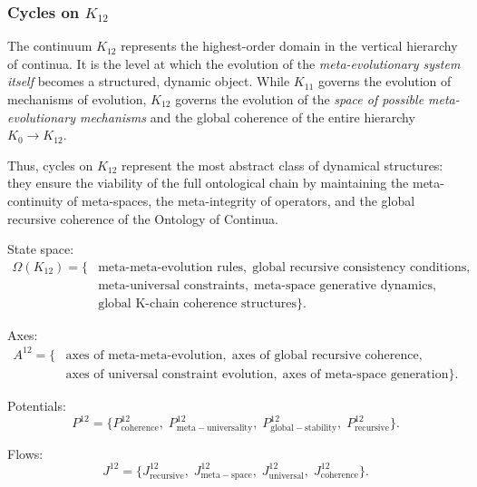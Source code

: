 
\subsubsection{Cycles on $K_{12}$}
\label{sec:cycles-k12}

The continuum $K_{12}$ represents the highest-order domain in the vertical
hierarchy of continua. It is the level at which the evolution of the
\emph{meta-evolutionary system itself} becomes a structured, dynamic object.
While $K_{11}$ governs the evolution of mechanisms of evolution, $K_{12}$
governs the evolution of the \emph{space of possible meta-evolutionary
mechanisms} and the global coherence of the entire hierarchy
$K_0 \to K_{12}$.

Thus, cycles on $K_{12}$ represent the most abstract class of dynamical
structures: they ensure the viability of the full ontological chain by
maintaining the meta-continuity of meta-spaces, the meta-integrity of
operators, and the global recursive coherence of the Ontology of Continua.

State space:
\[
  \begin{aligned}
  \Omega(K_{12})
  = \{&
     \text{meta-meta-evolution rules},\;
     \text{global recursive consistency conditions},\\
     &\text{meta-universal constraints},\;
     \text{meta-space generative dynamics},\\
     &\text{global K-chain coherence structures}
  \}.
  \end{aligned}
\]

Axes:
\[
  \begin{aligned}
  A^{12}
  = \{&
     \text{axes of meta-meta-evolution},\;
     \text{axes of global recursive coherence},\\
     &\text{axes of universal constraint evolution},\;
     \text{axes of meta-space generation}
  \}.
  \end{aligned}
\]

Potentials:
\[
  P^{12}
  =
  \{
     P^{12}_{\mathrm{coherence}},\;
     P^{12}_{\mathrm{meta\!-\!universality}},\;
     P^{12}_{\mathrm{global\!-\!stability}},\;
     P^{12}_{\mathrm{recursive}}
  \}.
\]

Flows:
\[
  J^{12}
  =
  \{
    J^{12}_{\mathrm{recursive}},\;
    J^{12}_{\mathrm{meta\!-\!space}},\;
    J^{12}_{\mathrm{universal}},\;
    J^{12}_{\mathrm{coherence}}
  \}.
\]


